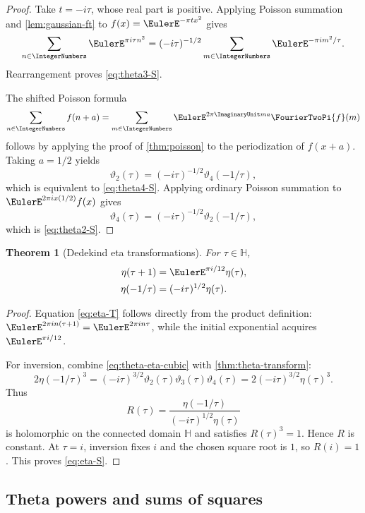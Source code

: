 \documentclass[11pt]{article}
\theoremstyle{blueplain}
\newtheorem{theorem}{Theorem}[section]
\theoremstyle{bluedef}
\begin{document}
\begin{proof}
Take $t=-i\tau$, whose real part is positive.  Applying Poisson summation and \cref{lem:gaussian-ft} to $f(x)=\EulerE^{-\pi tx^2}$ gives
\[
\sum_{n\in\IntegerNumbers}\EulerE^{\pi i\tau n^2}
=(-i\tau)^{-1/2}\sum_{m\in\IntegerNumbers}\EulerE^{-\pi im^2/\tau}.
\]
Rearrangement proves \eqref{eq:theta3-S}.

The shifted Poisson formula
\begin{equation}\label{eq:shifted-poisson}
\sum_{n\in\IntegerNumbers}f(n+a)=\sum_{m\in\IntegerNumbers}\EulerE^{2\pi\ImaginaryUnit ma}\FourierTwoPi{f}(m)
\end{equation}
follows by applying the proof of \cref{thm:poisson} to the periodization of $f(x+a)$.  Taking $a=1/2$ yields
\[
\vartheta_2(\tau)=(-i\tau)^{-1/2}\vartheta_4(-1/\tau),
\]
which is equivalent to \eqref{eq:theta4-S}.  Applying ordinary Poisson summation to $\EulerE^{2\pi ix(1/2)}f(x)$ gives
\[
\vartheta_4(\tau)=(-i\tau)^{-1/2}\vartheta_2(-1/\tau),
\]
which is \eqref{eq:theta2-S}.
\end{proof}

\begin{theorem}[Dedekind eta transformations]\label{thm:eta-transform}
For $\tau\in\mathbb H$,
\begin{align}
\eta(\tau+1)&=\EulerE^{\pi i/12}\eta(\tau), \label{eq:eta-T}\\
\eta(-1/\tau)&=(-i\tau)^{1/2}\eta(\tau). \label{eq:eta-S}
\end{align}
\end{theorem}

\begin{proof}
Equation \eqref{eq:eta-T} follows directly from the product definition: $\EulerE^{2\pi in(\tau+1)}=\EulerE^{2\pi in\tau}$, while the initial exponential acquires $\EulerE^{\pi i/12}$.

For inversion, combine \eqref{eq:theta-eta-cubic} with \cref{thm:theta-transform}:
\[
2\eta(-1/\tau)^3
=(-i\tau)^{3/2}\vartheta_2(\tau)\vartheta_3(\tau)\vartheta_4(\tau)
=2(-i\tau)^{3/2}\eta(\tau)^3.
\]
Thus
\[
R(\tau)=\frac{\eta(-1/\tau)}{(-i\tau)^{1/2}\eta(\tau)}
\]
is holomorphic on the connected domain $\mathbb H$ and satisfies $R(\tau)^3=1$.  Hence $R$ is constant.  At $\tau=i$, inversion fixes $i$ and the chosen square root is $1$, so $R(i)=1$.  This proves \eqref{eq:eta-S}.
\end{proof}

\subsection{Theta powers and sums of squares}
\end{document}
